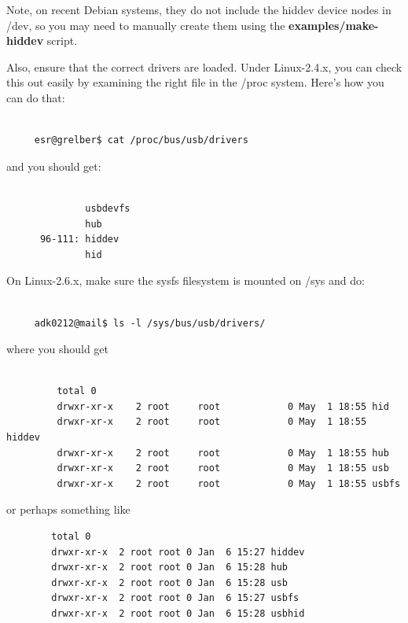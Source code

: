 Note, on recent Debian systems, they do not include the hiddev device nodes in
/dev, so you may need to manually create them using the {\bf
examples/make-hiddev} script.  

Also, ensure that the correct drivers are loaded. Under Linux-2.4.x, you can
check this out easily by examining the right file in the /proc system.  Here's
how you can do that: 

\footnotesize
\begin{verbatim}
     
     esr@grelber$ cat /proc/bus/usb/drivers
\end{verbatim}
\normalsize

and you should get: 

\footnotesize
\begin{verbatim}
     
              usbdevfs
              hub
      96-111: hiddev
              hid
\end{verbatim}
\normalsize

On Linux-2.6.x, make sure the sysfs filesystem is mounted on /sys and do: 

\footnotesize
\begin{verbatim}
     
     adk0212@mail$ ls -l /sys/bus/usb/drivers/
\end{verbatim}
\normalsize

where you should get 

\footnotesize
\begin{verbatim}
     
         total 0
         drwxr-xr-x    2 root     root            0 May  1 18:55 hid
         drwxr-xr-x    2 root     root            0 May  1 18:55 hiddev
         drwxr-xr-x    2 root     root            0 May  1 18:55 hub
         drwxr-xr-x    2 root     root            0 May  1 18:55 usb
         drwxr-xr-x    2 root     root            0 May  1 18:55 usbfs
\end{verbatim}
\normalsize

or perhaps something like 

\footnotesize
\begin{verbatim}
        total 0
        drwxr-xr-x  2 root root 0 Jan  6 15:27 hiddev
        drwxr-xr-x  2 root root 0 Jan  6 15:28 hub
        drwxr-xr-x  2 root root 0 Jan  6 15:28 usb
        drwxr-xr-x  2 root root 0 Jan  6 15:27 usbfs
        drwxr-xr-x  2 root root 0 Jan  6 15:28 usbhid
\end{verbatim}
\normalsize


